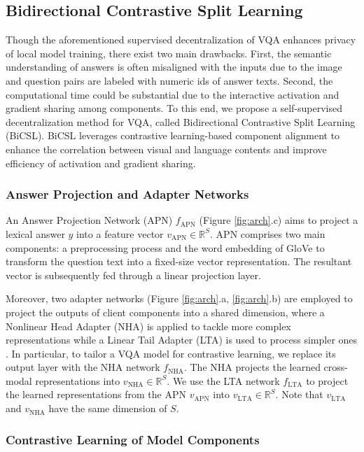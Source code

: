 \documentclass[letterpaper]{article} %
\begin{document}
\subsection{Bidirectional Contrastive Split Learning}

Though the aforementioned supervised decentralization of VQA enhances privacy of local model training, there exist two main drawbacks. First, the semantic understanding of answers is often misaligned with the inputs due to the image and question pairs are labeled with numeric ids of answer texts. Second, the computational time could be substantial due to the interactive activation and gradient sharing among components. To this end, we propose a self-supervised decentralization method for VQA, called Bidirectional Contrastive Split Learning (BiCSL). BiCSL leverages contrastive learning-based component alignment to enhance the correlation between visual and language contents and improve efficiency of activation and gradient sharing.

\subsubsection{Answer Projection and Adapter Networks}
An Answer Projection Network (APN) $f_{\text{APN}}$ (Figure \ref{fig:arch}.c) aims to project a lexical answer $y$ into a feature vector $v_{\text{APN}}\in \mathbb{R}^S$. APN comprises two main components: a preprocessing process and the word embedding of GloVe \cite{pennington2014glove} to transform the question text into a fixed-size vector representation. The resultant vector is subsequently fed through a linear projection layer.

Moreover, two adapter networks (Figure \ref{fig:arch}.a, \ref{fig:arch}.b) are employed to project the outputs of client components into a shared dimension, where a Nonlinear Head Adapter (NHA) is applied to tackle more complex representations while a Linear Tail Adapter (LTA) is used to process simpler ones \cite{mmv}. In particular, to tailor a VQA model for contrastive learning, we replace its output layer with the NHA network $f_{\text{NHA}}$. The NHA projects the learned cross-modal representations into $v_{\text{NHA}} \in \mathbb{R}^S$. We use the LTA network $f_{\text{LTA}}$ to project the learned representations from the APN $v_{\text{APN}}$ into $v_{\text{LTA}} \in \mathbb{R}^S$. Note that $v_{\text{LTA}}$ and $v_{\text{NHA}}$ have the same dimension of $S$. 


\subsubsection{Contrastive Learning of Model Components}
\end{document}
